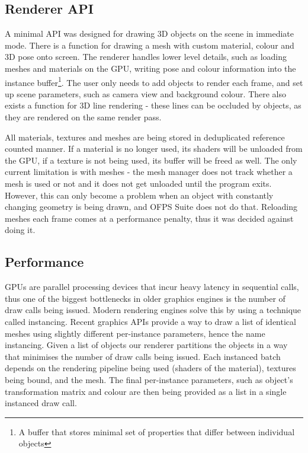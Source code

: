 \documentclass[11pt,english]{report}
\begin{document}
\subsection{Renderer API}

A minimal API was designed for drawing 3D objects on the scene in immediate mode. There is a function for drawing a mesh with custom material, colour and 3D pose onto screen. The renderer handles lower level details, such as loading meshes and materials on the GPU, writing pose and colour information into the instance buffer\footnote{A buffer that stores minimal set of properties that differ between individual objects}. The user only needs to add objects to render each frame, and set up scene parameters, such as camera view and background colour. There also exists a function for 3D line rendering - these lines can be occluded by objects, as they are rendered on the same render pass.

All materials, textures and meshes are being stored in deduplicated reference counted manner. If a material is no longer used, its shaders will be unloaded from the GPU, if a texture is not being used, its buffer will be freed as well. The only current limitation is with meshes - the mesh manager does not track whether a mesh is used or not and it does not get unloaded until the program exits. However, this can only become a problem when an object with constantly changing geometry is being drawn, and OFPS Suite does not do that. Reloading meshes each frame comes at a performance penalty, thus it was decided against doing it.

\subsection{Performance}

GPUs are parallel processing devices that incur heavy latency in sequential calls, thus one of the biggest bottlenecks in older graphics engines is the number of draw calls being issued. Modern rendering engines solve this by using a technique called instancing. Recent graphics APIs provide a way to draw a list of identical meshes using slightly different per-instance parameters, hence the name instancing. Given a list of objects our renderer partitions the objects in a way that minimises the number of draw calls being issued. Each instanced batch depends on the rendering pipeline being used (shaders of the material), textures being bound, and the mesh. The final per-instance parameters, such as object's transformation matrix and colour are then being provided as a list in a single instanced draw call.
\end{document}
